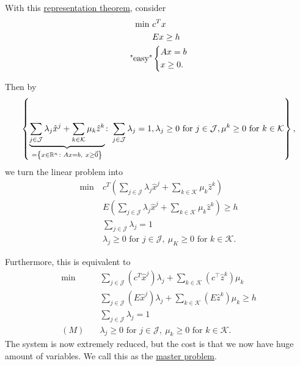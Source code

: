 With this \hyperref[thm:representation-theorem]{representation theorem}, consider
\begin{align*}
	\min~         & c^Tx          \\
	              & Ex\geq h      \\
	\text{"easy"} & \begin{dcases}
		                Ax = b \\
		                x\geq 0.
	                \end{dcases}
\end{align*}

Then by
\[
	\left\{\underbrace{\sum\limits_{j\in\mathcal{J}} \lambda_{j} \hat{x}^j + \sum\limits_{k\in\mathcal{K}}\mu_k \hat{z}^k}_{=\left\{x\in\mathbb{\MakeUppercase{R}}^n\colon Ax = b,\ x\geq \vec{0}\right\}}
	\colon \sum\limits_{j\in\mathcal{J}}\lambda_{j} = 1, \lambda_{j}\geq 0 \text{ for }j\in \mathcal{J}, \mu^k\geq 0\text{ for } k\in \mathcal{K}\right\},
\]
we turn the linear problem into
\begin{align*}
	\min~ & c^T\left(\sum\limits_{j\in\mathcal{J}}\lambda_{j}\hat{x}^j + \sum\limits_{k\in\mathcal{K}}\mu_k \hat{z}^k  \right)      \\
	      & E\left(\sum\limits_{j\in\mathcal{J}}\lambda_{j}\hat{x}^j + \sum\limits_{k\in\mathcal{K}}\mu_k \hat{z}^k  \right) \geq h \\
	      & \sum\limits_{j\in\mathcal{J}}\lambda_{j} = 1                                                                            \\
	      & \lambda_{j}\geq 0 \text{ for }j\in\mathcal{J},\ \mu_K\geq 0 \text{ for }k\in\mathcal{K}.
\end{align*}

Furthermore, this is equivalent to
\begin{align*}
	\min~    & \sum\limits_{j\in\mathcal{J}}\left(c^T\hat{x}^j\right)\lambda_{j} + \sum\limits_{k\in\mathcal{K}}\left(c^{\top} \hat{z}^k  \right)\mu_k \\
	         & \sum\limits_{j\in\mathcal{J}}\left(E\hat{x}^j\right)\lambda_{j} + \sum\limits_{k\in\mathcal{K}}\left(E \hat{z}^k \right)\mu_k \geq h    \\
	         & \sum\limits_{j\in\mathcal{J}}\lambda_{j} = 1                                                                                            \\
	(M)\quad & \lambda_{j}\geq 0 \text{ for }j\in\mathcal{J},\ \mu_k\geq 0 \text{ for }k\in\mathcal{K}.
\end{align*}
The system is now extremely reduced, but the cost is that we now have huge amount of variables. We call this as the \hyperref[def:master-problem]{master problem}.

